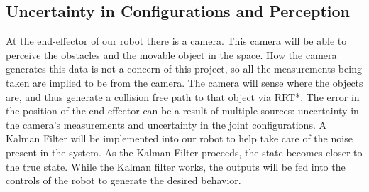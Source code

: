 \subsection*{Uncertainty in Configurations and Perception}
At the end-effector of our robot there is a camera.  This camera will be able to perceive the obstacles and the movable object in the space.  How the camera generates this data is not a concern of this project, so all the measurements being taken are implied to be from the camera.  The camera will sense where the objects are, and thus generate a collision free path to that object via RRT*.  The error in the position of the end-effector can be a result of multiple sources: uncertainty in the camera's measurements and uncertainty in the joint configurations.  A Kalman Filter will be implemented into our robot to help take care of the noise present in the system.  As the Kalman Filter proceeds, the state becomes closer to the true state.  While the Kalman filter works, the outputs will be fed into the controls of the robot to generate the desired behavior.